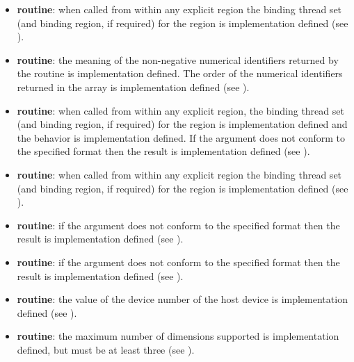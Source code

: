 \begin{itemize}
\item {} \textbf{routine}: when called from within any explicit
 region the binding thread set (and binding region, if required) for the
 region is implementation defined (see
).

\item {} \textbf{routine}: the meaning of the
non-negative numerical identifiers returned by the
 routine is implementation defined. The
order of the numerical identifiers returned in the array  is
implementation defined (see
).

\item {} \textbf{routine}: when called from within any explicit
 region, the binding thread set (and binding region, if required) for the
 region is implementation defined and the
behavior is implementation defined. If the argument does not
conform to the specified format then the result is implementation defined (see
).

\item {} \textbf{routine}: when called from within any explicit
 region the binding thread set (and binding region, if required) for the
 region is implementation defined (see
).

\item {} \textbf{routine}:  if the argument does not
conform to the specified format then the result is implementation defined (see
).

\item {} \textbf{routine}:  if the  argument does not
conform to the specified format then the result is implementation defined (see
).

\item {} \textbf{routine}: the value of
  the device number of the host device is implementation defined (see ).

\item {} \textbf{routine}:
  the maximum number of dimensions supported is implementation defined, but
  must be at least three (see ).


\end{itemize}
